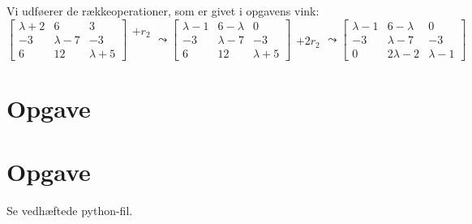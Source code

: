 \documentclass[a4paper,12pt]{article}
\begin{document}
Vi udføerer de rækkeoperationer, som er givet i opgavens vink:\\

$
\left[\begin{array}{ccc}
    \lambda+2 & 6 & 3\\
    -3 & \lambda-7 & -3 \\
    6 & 12 & \lambda+5
\end{array}\right]
\begin{array}{ccc}
    +r_2\\
    \\
    \\
\end{array}
\leadsto
\left[\begin{array}{ccc}
    \lambda-1 & 6-\lambda & 0\\
    -3 & \lambda-7 & -3 \\
    6 & 12 & \lambda+5
\end{array}\right]
\begin{array}{ccc}
    \\
    \\
    +2r_2\\
\end{array}
\leadsto
\left[\begin{array}{ccc}
    \lambda-1 & 6-\lambda & 0\\
    -3 & \lambda-7 & -3 \\
    0 & 2\lambda -2 & \lambda-1
\end{array}\right]
$\\

\subsection{}


\subsection{}


\subsection{}


\subsection{}



\section[Opgave]{Opgave}
\subsection{}


\subsection{}


\subsection{}


\section[Opgave]{Opgave}
Se vedhæftede python-fil.
\end{document}
